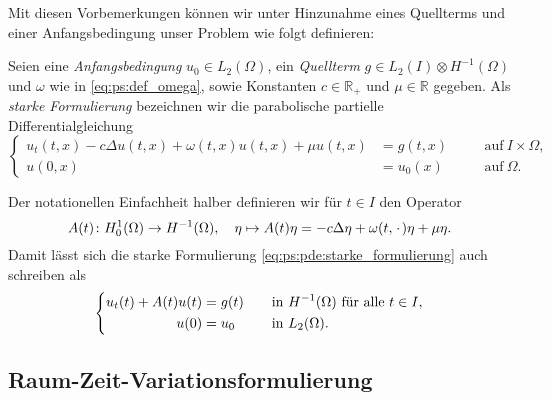 Mit diesen Vorbemerkungen können wir unter Hinzunahme eines Quellterms und einer Anfangsbedingung unser Problem wie folgt definieren:

\begin{Definition}
\label{def:ps:pde:starke_formulierung}
    Seien eine \emph{Anfangsbedingung} $u_{0} \in L_{2}(\Omega)$, ein \emph{Quellterm} $g \in L_{2}(I) \otimes H^{-1}(\Omega)$ und $\omega$ wie in \cref{eq:ps:def_omega}, sowie Konstanten $c \in \mathbb{R}_{+}$ und $\mu \in \mathbb{R}$ gegeben.
    Als \emph{starke Formulierung} bezeichnen wir die parabolische partielle Differentialgleichung
    \begin{equation}
    \label{eq:ps:pde:starke_formulierung}
        \left\{
        \begin{aligned}
            u_{t}(t, x) - c \Delta u(t, x) + \omega(t, x) u(t, x) + \mu u(t, x) &= g(t, x) \quad &&\text{auf}~I \times \Omega,\\
            u(0, x) &= u_{0}(x) \quad &&\text{auf}~\Omega.
        \end{aligned}
        \right.
    \end{equation}
\end{Definition}

\begin{Bemerkung}
\label{bem:ps:pde:definition_operator_A}
    Der notationellen Einfachheit halber definieren wir für $t \in I$ den Operator
    \begin{equation}
    \label{eq:ps:pde:definition_operator_A}
        A(t) \colon H^{1}_{0}(\Omega) \to H^{-1}(\Omega), \quad \eta \mapsto A(t) \eta = - c \Delta \eta + \omega(t, \blank) \eta + \mu \eta.
    \end{equation}
    Damit lässt sich die starke Formulierung \cref{eq:ps:pde:starke_formulierung} auch schreiben als
    \begin{equation}
        \left\{
        \begin{aligned}
            u_t(t) + A(t)u(t) &= g(t) \quad &&\text{in}~H^{-1}(\Omega)~\fa t \in I,\\
            u(0) &= u_{0} \quad &&\text{in}~L_{2}(\Omega).
        \end{aligned}
        \right.
    \end{equation}
\end{Bemerkung}

\subsection{Raum-Zeit-Variationsformulierung} %
\label{sub:ps:rzvp:raum_zeit_variationsformulierung}


